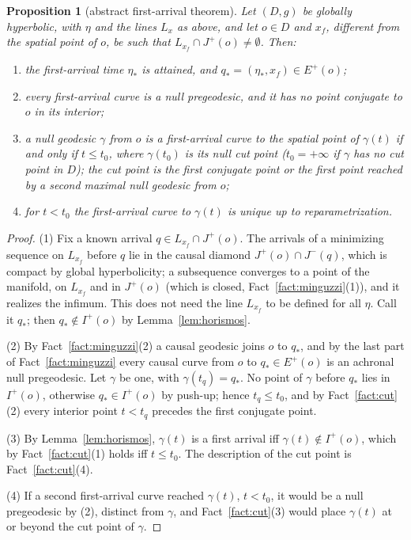 \documentclass[aip,jmp,amsmath,amssymb,reprint]{revtex4-2}
\theoremstyle{plain}
\newtheorem{proposition}{Proposition}[section]
\theoremstyle{definition}
\begin{document}
\begin{proposition}[abstract first-arrival theorem]\label{prop:first-arrival}
Let $(D,g)$ be globally hyperbolic, with $\eta$ and the lines $L_x$ as above, and let
$o\in D$ and $x_f$, different from the spatial point of $o$, be such that $L_{x_f}\cap J^+(o)\neq\emptyset$. Then:
\begin{enumerate}
\item the first-arrival time $\eta_*$ is attained, and $q_*=(\eta_*,x_f)\in E^+(o)$;
\item every first-arrival curve is a null pregeodesic, and it has no point conjugate to
  $o$ in its interior;
\item a null geodesic $\gamma$ from $o$ is a first-arrival curve to the spatial point of
  $\gamma(t)$ if and only if $t\le t_0$, where $\gamma(t_0)$ is its null cut point ($t_0=+\infty$ if $\gamma$ has no cut point in $D$); the cut
  point is the first conjugate point or the first point reached by a second maximal
  null geodesic from $o$;
\item for $t<t_0$ the first-arrival curve to $\gamma(t)$ is unique up to
  reparametrization.
\end{enumerate}
\end{proposition}

\begin{proof}
(1) Fix a known arrival $q\in L_{x_f}\cap J^+(o)$. The arrivals of a minimizing sequence on
$L_{x_f}$ before $q$ lie in the causal diamond $J^+(o)\cap J^-(q)$, which is compact by
global hyperbolicity; a subsequence converges to a point of the manifold, on $L_{x_f}$ and in
$J^+(o)$ (which is closed, Fact~\ref{fact:minguzzi}(1)), and it realizes the infimum. This
does not need the line $L_{x_f}$ to be defined for all $\eta$. Call it $q_*$; then
$q_*\notin I^+(o)$ by Lemma~\ref{lem:horismos}.

(2) By Fact~\ref{fact:minguzzi}(2) a causal geodesic joins $o$ to $q_*$, and by the last
part of Fact~\ref{fact:minguzzi} every causal curve from $o$ to $q_*\in E^+(o)$ is an
achronal null pregeodesic. Let $\gamma$ be one, with $\gamma(t_q)=q_*$. No point of
$\gamma$ before $q_*$ lies in $I^+(o)$, otherwise $q_*\in I^+(o)$ by push-up; hence
$t_q\le t_0$, and by Fact~\ref{fact:cut}(2) every interior point $t<t_q$ precedes the
first conjugate point.

(3) By Lemma~\ref{lem:horismos}, $\gamma(t)$ is a first arrival iff $\gamma(t)\notin I^+(o)$,
which by Fact~\ref{fact:cut}(1) holds iff $t\le t_0$. The description of the cut
point is Fact~\ref{fact:cut}(4).

(4) If a second first-arrival curve reached $\gamma(t)$, $t<t_0$, it would be a null
pregeodesic by (2), distinct from $\gamma$, and Fact~\ref{fact:cut}(3) would place
$\gamma(t)$ at or beyond the cut point of $\gamma$.
\end{proof}
\end{document}
